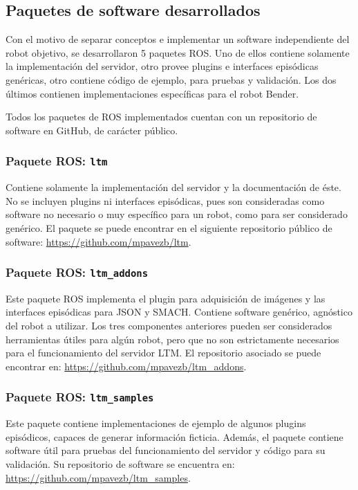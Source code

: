 \subsection{Paquetes de software desarrollados}\label{sec:impl_packages}

Con el motivo de separar conceptos e implementar un software independiente del robot objetivo, se desarrollaron 5 paquetes ROS. Uno de ellos contiene solamente la implementación del servidor, otro provee plugins e interfaces episódicas genéricas, otro contiene código de ejemplo, para pruebas y validación. Los dos últimos contienen implementaciones específicas para el robot Bender.

Todos los paquetes de ROS implementados cuentan con un repositorio de software en GitHub, de carácter público.

\subsubsection{Paquete ROS: \texttt{ltm}}

Contiene solamente la implementación del servidor y la documentación de éste. No se incluyen plugins ni interfaces episódicas, pues son consideradas como software no necesario o muy específico para un robot, como para ser considerado genérico. El paquete se puede encontrar en el siguiente repositorio público de software: \url{https://github.com/mpavezb/ltm}.

\subsubsection{Paquete ROS: \texttt{ltm\_addons}}

Este paquete ROS implementa el plugin para adquisición de imágenes y las interfaces episódicas para JSON y SMACH. Contiene software genérico, agnóstico del robot a utilizar. Los tres componentes anteriores pueden ser considerados herramientas útiles para algún robot, pero que no son estrictamente necesarios para el funcionamiento del servidor LTM. El repositorio asociado se puede encontrar en: \url{https://github.com/mpavezb/ltm\_addons}.

\subsubsection{Paquete ROS: \texttt{ltm\_samples}}

Este paquete contiene implementaciones de ejemplo de algunos plugins episódicos, capaces de generar información ficticia. Además, el paquete contiene software útil para pruebas del funcionamiento del servidor y código para su validación. Su repositorio de software se encuentra en: \url{https://github.com/mpavezb/ltm\_samples}.

